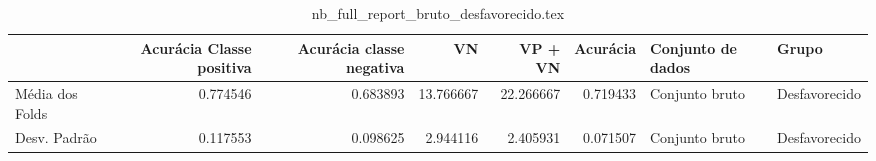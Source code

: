 \begin{table}
\centering
\caption{nb_full_report_bruto_desfavorecido.tex}
\label{nb_full_report_bruto_desfavorecido.tex}
\begin{tabular}{lrrrrrll}
\toprule
{} &  Acurácia Classe positiva &  Acurácia classe negativa &        VN  &   VP + VN  &  Acurácia & Conjunto de dados &          Grupo \\
\midrule
Média dos Folds &                  0.774546 &                  0.683893 &  13.766667 &  22.266667 &  0.719433 &    Conjunto bruto &  Desfavorecido \\
Desv. Padrão    &                  0.117553 &                  0.098625 &   2.944116 &   2.405931 &  0.071507 &    Conjunto bruto &  Desfavorecido \\
\bottomrule
\end{tabular}
\end{table}
